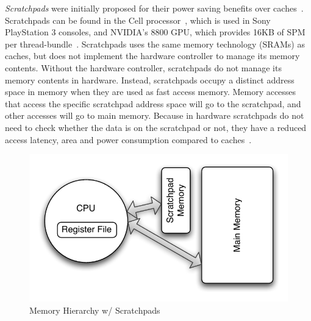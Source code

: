 \emph{Scratchpads} were initially proposed for their power saving benefits over caches~\cite{Banakar2002}.
Scratchpads can be found in the Cell processor~\cite{cellproc}, which is used in Sony PlayStation 3 consoles, and NVIDIA's 8800 GPU, which provides 16KB of SPM per thread-bundle~\cite{8800gpu}.
Scratchpads uses the same memory technology (SRAMs) as caches, but does not implement the hardware controller to manage its memory contents.
Without the hardware controller, scratchpads do not manage its memory contents in hardware.
Instead, scratchpads occupy a distinct address space in memory when they are used as fast access memory.
Memory accesses that access the specific scratchpad address space will go to the scratchpad, and other accesses will go to main memory. 
Because in hardware scratchpads do not need to check whether the data is on the scratchpad or not, they have a reduced access latency, area and power consumption compared to caches~\cite{Banakar2002}. 

\begin{figure}
  \vspace{-20pt}
  \begin{center}
    \includegraphics[scale=.5]{figs/pret_mem_hierarchy}
  \end{center}
  \vspace{-10pt}
  \caption{Memory Hierarchy w/ Scratchpads}
  \label{fig:pret_mem_hierarchy}
\end{figure}   

